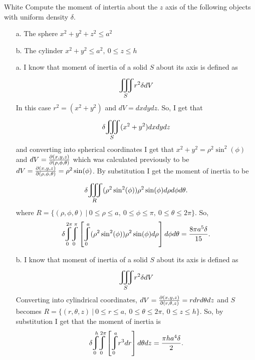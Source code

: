 \documentclass[titlepage]{article}
\begin{document}
\begin{cproblem}{4}{White}
Compute the moment of intertia about the $z$ axis of the following objects with uniform density $\delta$.
\begin{itemize}
\item[a.] The sphere $x^2 + y^2 + z^2 \leq a^2$
\item[b.] The cylinder $x^2 + y^2 \leq a^2, \ 0 \leq z\leq h$
\end{itemize}
\end{cproblem}
\begin{solution}
\vspace{-2em}
\begin{itemize}
\item[a.] I know that moment of inertia of a solid $S$ about its axis is defined as 
$$\bigiiint{S}{} r^2\delta dV $$
In this case $r^2 = (x^2 + y^2)$ and $dV = dxdydz$. So, I get that
$$\delta\bigiiint{S}{} (x^2 + y^2) dxdydz $$
and converting into spherical coordinates I get that $x^2 + y^2  = \rho^2\sin^2(\phi)$ and $dV = \frac{\partial (x,y,z)}{\partial (\rho,\phi,\theta)}$ which was calculated previously to be $dV = \frac{\partial (x,y,z)}{\partial (\rho,\phi,\theta)} = \rho^2\sin(\phi)$. By substitution I get the moment of inertia to be
$$\delta\bigiiint{R}{} (\rho^2\sin^2(\phi))\rho^2\sin(\phi) d\rho d\phi d\theta.$$
where $R = \{(\rho,\phi,\theta) \ | \ 0 \leq \rho \leq a, \ 0 \leq \phi \leq \pi, \ 0 \leq \theta \leq 2\pi\}$. So, 
$$\delta \mlvarint\limits_{0}^{2\pi}  \mlvarint\limits_{0}^{\pi}  \left[\mlvarint\limits_{0}^{a} (\rho^2\sin^2(\phi))\rho^2\sin(\phi) d\rho \right]d\phi d\theta = \frac{8\pi a^5\delta}{15}.$$
\item[b.] I know that moment of inertia of a solid $S$ about its axis is defined as 
$$\bigiiint{S}{} r^2\delta dV $$
Converting into cylindrical coordinates, $dV = \frac{\partial(x,y,z)}{\partial(r,\theta,z)} = r dr d\theta dz$ and $S$ becomes $R = \{(r,\theta,z) \ | \ 0 \leq r \leq a, \ 0 \leq \theta \leq 2\pi, \ 0 \leq z \leq h\}$. So, by substitution I get that the moment of inertia is
$$\delta \mlvarint\limits_{0}^{h} \mlvarint\limits_{0}^{2\pi} \left[ \mlvarint\limits_{0}^{a} r^3 dr\right]d\theta dz = \frac{\pi ha^4\delta}{2}.$$
\end{itemize}
\end{solution}
\end{document}
